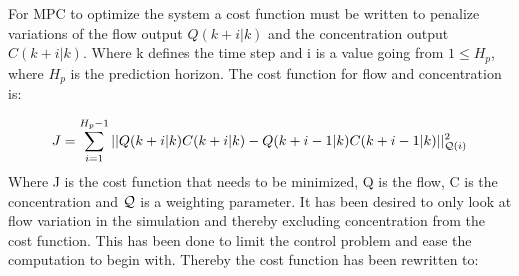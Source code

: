 

For MPC to optimize the system a cost function must be written to penalize variations of the flow output $Q(k+i|k)$ and the concentration output $C(k+i|k)$. Where k defines the time step and i is a value going from $1\leq H_p$, where $H_p$ is the prediction horizon. The cost function for flow and concentration is:

\begin{equation}
	 J = \sum_{i=1}^{H_p-1} || Q(k+i|k)C(k+i|k)-Q(k+i-1|k)C(k+i-1|k)||_{\CMcal{Q}(i)}^2
\end{equation}
Where J is the cost function that needs to be minimized, Q is the flow, C is the concentration and $\CMcal{Q}$ is a weighting parameter. It has been desired to only look at flow variation in the simulation and thereby excluding concentration from the cost function. This has been done to limit the control problem and ease the computation to begin with. Thereby the cost function has been rewritten to: 

